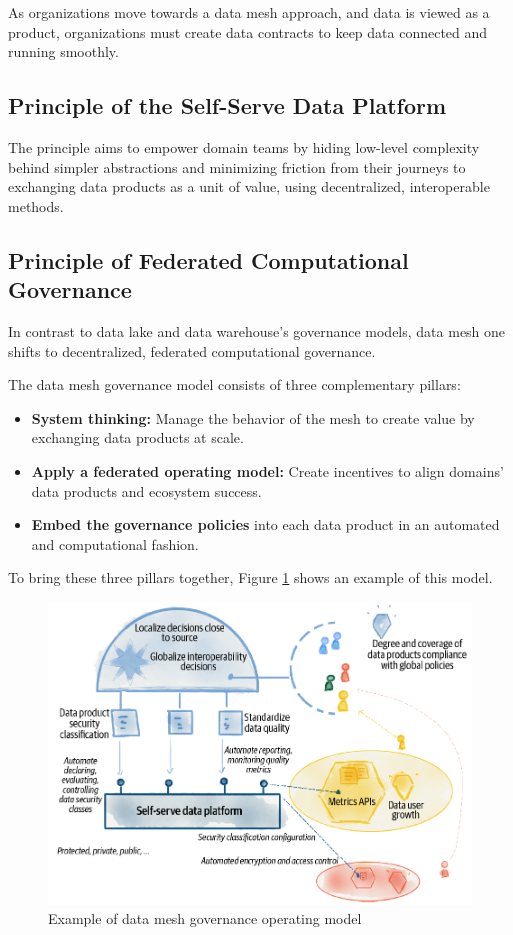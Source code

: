 \documentclass[12pt, a4paper]{book}
\begin{document}
As organizations move towards a data mesh approach, and data is viewed as a product, organizations must create data contracts to keep data connected and running smoothly.

\subsection{Principle of the Self-Serve Data Platform}
The principle aims to empower domain teams by hiding low-level complexity behind simpler abstractions and minimizing friction from their journeys to exchanging data products as a unit of value, using decentralized, interoperable methods.


\subsection{Principle of Federated Computational Governance}
In contrast to data lake and data warehouse's governance models, data mesh one shifts to decentralized, federated computational governance.

The data mesh governance model consists of three complementary pillars:
	\begin{itemize}[nosep]
		\item \textbf{System thinking:} Manage the behavior of the mesh to create value by exchanging data products at scale.
		\item \textbf{Apply a federated operating model:} Create incentives to align domains' data products and ecosystem success.
		\item \textbf{Embed the governance policies} into each data product in an automated and computational fashion. 
	\end{itemize}

To bring these three pillars together, Figure \ref{DataGov} shows an example of this model.

\begin{figure}[h]
	\begin{framed}
		\centering
		\includegraphics[width=12cm]{DataGov.png}
		\caption{Example of data mesh governance operating model}
		\label{DataGov}
	\end{framed}
\end{figure}
\end{document}
